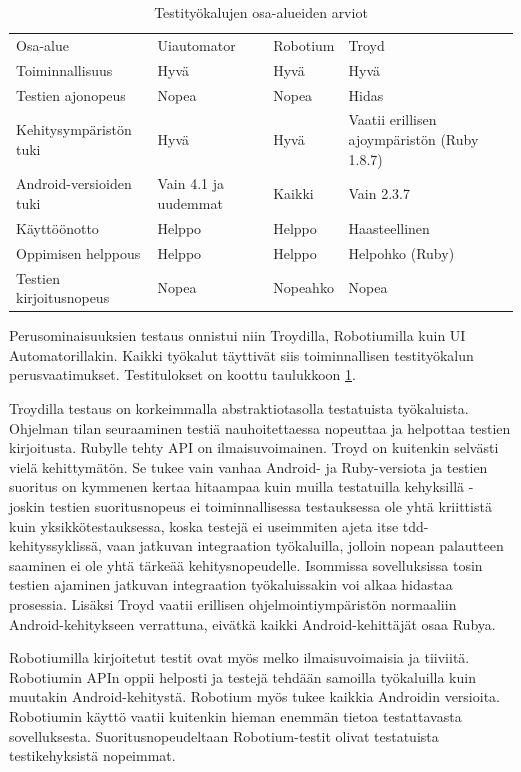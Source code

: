\begin{table}[h]
\centering
\begin{tabular}{ p{} p{} p{} p{} }
  Osa-alue & Uiautomator & Robotium & Troyd \\
  Toiminnallisuus & Hyvä & Hyvä & Hyvä \\
  Testien ajonopeus & Nopea & Nopea & Hidas \\
  Kehitysympäristön tuki & Hyvä & Hyvä & Vaatii erillisen ajoympäristön (Ruby 1.8.7) \\
  Android-versioiden tuki & Vain 4.1 ja uudemmat & Kaikki & Vain 2.3.7 \\
  Käyttöönotto & Helppo & Helppo & Haasteellinen \\
  Oppimisen helppous & Helppo & Helppo & Helpohko (Ruby) \\
  Testien kirjoitusnopeus & Nopea & Nopeahko & Nopea \\
\end{tabular}
\caption{Testityökalujen osa-alueiden arviot}
\label{functionaltest_evaluation}
\end{table}

Perusominaisuuksien testaus onnistui niin Troydilla, Robotiumilla kuin UI Automatorillakin. Kaikki työkalut täyttivät siis toiminnallisen testityökalun perusvaatimukset. Testitulokset on koottu taulukkoon \ref{functionaltest_evaluation}.

Troydilla testaus on korkeimmalla abstraktiotasolla testatuista työkaluista. Ohjelman tilan seuraaminen testiä nauhoitettaessa nopeuttaa ja helpottaa testien kirjoitusta. Rubylle tehty API on ilmaisuvoimainen. Troyd on kuitenkin selvästi vielä kehittymätön. Se tukee vain vanhaa Android- ja Ruby-versiota ja testien suoritus on kymmenen kertaa hitaampaa kuin muilla testatuilla kehyksillä - joskin testien suoritusnopeus ei toiminnallisessa testauksessa ole yhtä kriittistä kuin yksikkötestauksessa, koska testejä ei useimmiten ajeta itse tdd-kehityssyklissä, vaan jatkuvan integraation työkaluilla, jolloin nopean palautteen saaminen ei ole yhtä tärkeää kehitysnopeudelle. Isommissa sovelluksissa tosin testien ajaminen jatkuvan integraation työkaluissakin voi alkaa hidastaa prosessia. Lisäksi Troyd vaatii erillisen ohjelmointiympäristön normaaliin Android-kehitykseen verrattuna, eivätkä kaikki Android-kehittäjät osaa Rubya.

Robotiumilla kirjoitetut testit ovat myös melko ilmaisuvoimaisia ja tiiviitä. Robotiumin APIn oppii helposti ja testejä tehdään samoilla työkaluilla kuin muutakin Android-kehitystä. Robotium myös tukee kaikkia Androidin versioita. Robotiumin käyttö vaatii kuitenkin hieman enemmän tietoa testattavasta sovelluksesta. Suoritusnopeudeltaan Robotium-testit olivat testatuista testikehyksistä nopeimmat.

